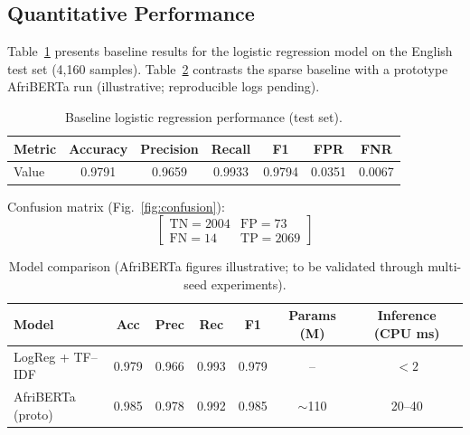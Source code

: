 \documentclass[runningheads]{llncs}
\begin{document}
\subsection{Quantitative Performance} Table~\ref{tab:baseline} presents baseline results for the logistic regression model on the English test set (4{,}160 samples). Table~\ref{tab:comparison} contrasts the sparse baseline with a prototype AfriBERTa run (illustrative; reproducible logs pending). \begin{table}[H] \centering \caption{Baseline logistic regression performance (test set).} \label{tab:baseline} \begin{tabular}{lcccccc} \toprule Metric & Accuracy & Precision & Recall & F1 & FPR & FNR\\ \midrule Value & 0.9791 & 0.9659 & 0.9933 & 0.9794 & 0.0351 & 0.0067\\ \bottomrule \end{tabular} \end{table} Confusion matrix (Fig.~\ref{fig:confusion}): \[ \begin{bmatrix} \text{TN}=2004 & \text{FP}=73\\ \text{FN}=14 & \text{TP}=2069 \end{bmatrix} \] \begin{table}[H] \centering \caption{Model comparison (AfriBERTa figures illustrative; to be validated through multi-seed experiments).} \label{tab:comparison} \begin{tabular}{lcccccc} \toprule Model & Acc & Prec & Rec & F1 & Params (M) & Inference (CPU ms)\\ \midrule LogReg + TF--IDF & 0.979 & 0.966 & 0.993 & 0.979 & -- & $<2$\\ AfriBERTa (proto) & 0.985 & 0.978 & 0.992 & 0.985 & $\sim$110 & 20--40\\ \bottomrule \end{tabular} \end{table}
\end{document}
